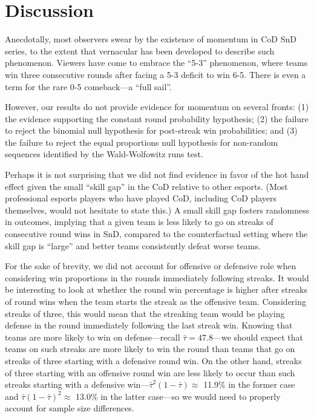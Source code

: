 \documentclass{article}
\begin{document}
\hypertarget{discussion}{%
\section{Discussion}\label{discussion}}

Anecdotally, most observers swear by the existence of momentum in CoD
SnD series, to the extent that vernacular has been developed to describe
such phenomenon. Viewers have come to embrace the ``5-3'' phenomenon,
where teams win three consecutive rounds after facing a 5-3 deficit to
win 6-5. There is even a term for the rare 0-5 comeback---a ``full
sail''.

However, our results do not provide evidence for momentum on several
fronts: (1) the evidence supporting the constant round probability
hypothesis; (2) the failure to reject the binomial null hypothesis for
post-streak win probabilities; and (3) the failure to reject the equal
proportions null hypothesis for non-random sequences identified by the
Wald-Wolfowitz runs test.

Perhaps it is not surprising that we did not find evidence in favor of
the hot hand effect given the small ``skill gap'' in the CoD relative to
other esports. (Most professional esports players who have played CoD,
including CoD players themselves, would not hesitate to state this.) A
small skill gap fosters randomness in outcomes, implying that a given
team is less likely to go on streaks of consecutive round wins in SnD,
compared to the counterfactual setting where the skill gap is ``large''
and better teams consistently defeat worse teams.

For the sake of brevity, we did not account for offensive or defensive
role when considering win proportions in the rounds immediately
following streaks. It would be interesting to look at whether the round
win percentage is higher after streaks of round wins when the team
starts the streak as the offensive team. Considering streaks of three,
this would mean that the streaking team would be playing defense in the
round immediately following the last streak win. Knowing that teams are
more likely to win on defense---recall \(\bar{\tau} = 47.8%
\)---we should expect that teams on such streaks are more likely to win
the round than teams that go on streaks of three starting with a
defensive round win. On the other hand, streaks of three starting with
an offensive round win are less likely to occur than such streaks
starting with a defensive
win---\(\bar{\tau}^2 (1 - \bar{\tau}) \approx\) 11.9\% in the former
case and \(\bar{\tau} (1 - \bar{\tau})^2 \approx\) 13.0\% in the latter
case---so we would need to properly account for sample size differences.
\end{document}
